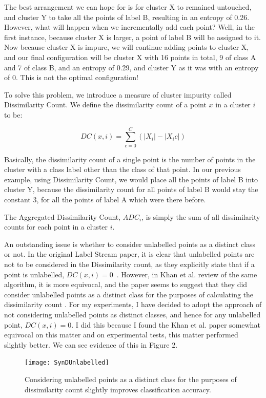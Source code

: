 \documentclass[12pt,a4paper,oneside]{report}
\begin{document}
The best arrangement we can hope for is for cluster X to remained untouched, and cluster Y to take all the points of label B, resulting in an entropy of 0.26. However, what will happen when we incrementally add each point? Well, in the first instance, because cluster X is larger, a point of label B will be assigned to it. Now because cluster X is impure, we will continue adding points to cluster X, and our final configuration will be cluster X with 16 points in total, 9 of class A and  7 of class B, and an entropy of 0.29, and cluster Y as it was with an entropy of 0. This is not the optimal configuration!

To solve this problem, we introduce a measure of cluster impurity called Dissimilarity Count. We define the dissimilarity count of a point \(x\) in a cluster \(i\) to be:

\[DC(x,i) = \sum_{c=0}^C(|X_i| - |X_ic|)\] 

Basically, the dissimilarity count of a single point is the number of points in the cluster with a class label other than the class of that point. In our previous example, using Dissimilarity Count, we would place all the points of label B into cluster Y, because the dissimilarity count for all points of label B would stay the constant 3, for all the points of label A which were there before. 

The Aggregated Dissimilarity Count, $ADC_i$, is simply the sum of all dissimilarity counts for each point in a cluster $i$. 

An outstanding issue is whether to consider unlabelled points as a distinct class or not. In the original Label Stream paper, it is clear that unlabelled points are not to be considered in the Dissimilarity count, as they explicitly state that if a point is unlabelled, \(DC(x,i) = 0\)~\cite{LabStr}. However, in Khan et al. review of the same algorithm, it is more equivocal, and the paper seems to suggest that they did consider unlabelled points as a distinct class for the purposes of calculating the dissimilarity count \cite{TechRep}. For my experiments, I have decided to adopt the approach of not considering unlabelled points as distinct classes, and hence for any unlabelled point, \(DC(x,i) = 0\). I did this because I found the Khan et al. paper somewhat equivocal on this matter and on experimental tests, this matter performed slightly better.  We can see evidence of this in Figure 2. 

\begin{figure}
	\centering
	\texttt{[image: SynDUnlabelled]}
	\caption{Considering unlabelled points as a distinct class for the purposes of dissimilarity count slightly improves classification accuracy.}
\end{figure}
 
\end{document}
